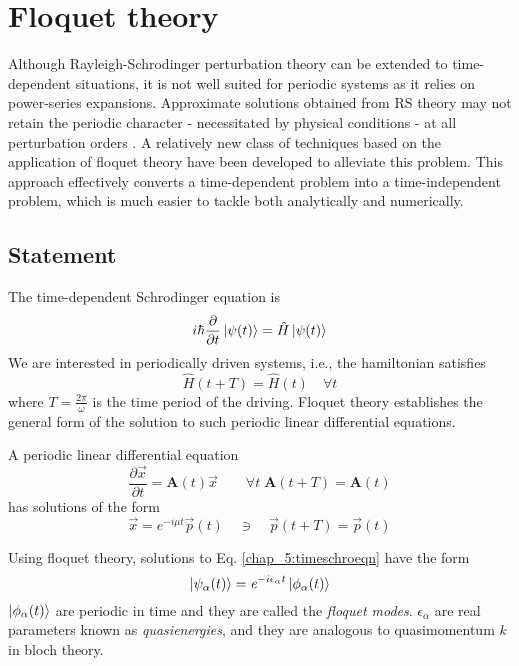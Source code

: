 %

\chapter{Floquet theory}
Although Rayleigh-Schrodinger perturbation theory can be extended to time-dependent situations, it is not well suited for periodic systems as it relies on power-series
expansions. Approximate solutions obtained from RS theory may not retain the periodic character - necessitated by physical conditions - at all perturbation orders \cite{hanggi1998driven}.
A relatively new class of techniques based on the application of floquet theory have been developed to alleviate this problem. This approach effectively converts a time-dependent
problem into a time-independent problem, which is much easier to tackle both analytically and numerically.
\section{Statement}
The time-dependent Schrodinger equation is
\begin{equation}
  \label{chap_5:timeschroeqn}i\hbar\frac{\partial}{\partial t}\ket{\psi (t)} = \hat{H}\ket{\psi (t)}
\end{equation}We are interested in periodically driven systems, i.e., the hamiltonian satisfies
\begin{equation}
  \hat{H}(t+T) = \hat{H}(t) \quad \forall t
\end{equation} where $T = \frac{2\pi}{\omega}$ is the time period of the driving. Floquet theory establishes the general form of the solution 
to such periodic linear differential equations.
\newline
\begin{theorem} A periodic linear differential equation 
  \begin{equation*}
  \frac{\partial\vec{x}}{\partial t} = \mathbf{A}(t) \vec{x} \qquad \forall t \; \mathbf{A}(t+T) = \mathbf{A}(t)
  \end{equation*} has solutions of the form 
  \begin{equation*}
    \vec{x} = \mathit{e}^{-i \mu t} \vec{p}(t) \quad \ni \quad \vec{p}(t+T) = \vec{p}(t)
  \end{equation*}
\end{theorem}
Using floquet theory, solutions to Eq. \eqref{chap_5:timeschroeqn} have the form
\begin{equation}
 \label{chap_5:floquetstate}\ket{\psi_{\alpha}(t)} = \mathit{e}^{-i \epsilon_{\alpha} t} \ket{\phi_{\alpha}(t)}
\end{equation} $\ket{\phi_{\alpha}(t)}$ are periodic in time and they are called the \emph{floquet modes}. $\epsilon_{\alpha}$ are real parameters known as \emph{quasienergies}, 
and they are analogous to quasimomentum $k$ in bloch theory. 

